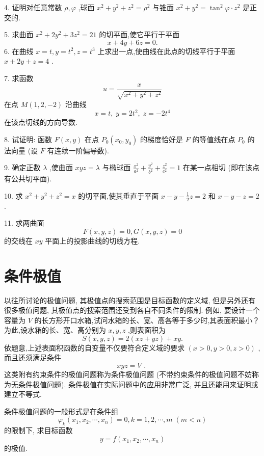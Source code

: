 4. 证明对任意常数 \(\rho ,\varphi\) ,球面 \({x}^{2} + {y}^{2} + {z}^{2} = {\rho }^{2}\) 与锥面 \({x}^{2} + {y}^{2} = {\tan }^{2}\varphi  \cdot  {z}^{2}\) 是正交的.

5. 求曲面 \({x}^{2} + 2{y}^{2} + 3{z}^{2} = {21}\) 的切平面,使它平行于平面
\[
x + {4y} + {6z} = 0.
\]
6. 在曲线 \(x = t,y = {t}^{2},z = {t}^{3}\) 上求出一点,使曲线在此点的切线平行于平面 \(x + {2y} + z = 4\) .

7. 求函数
\[
u = \frac{x}{\sqrt{{x}^{2} + {y}^{2} + {z}^{2}}}
\]
在点 \(M\left( {1,2, - 2}\right)\) 沿曲线
\[
x = t,\;y = 2{t}^{2},\;z =  - 2{t}^{4}
\]
在该点切线的方向导数.

8. 试证明: 函数 \(F\left( {x,y}\right)\) 在点 \({P}_{0}\left( {{x}_{0},{y}_{0}}\right)\) 的梯度恰好是 \(F\) 的等值线在点 \({P}_{0}\) 的法向量 (设 \(F\) 有连续一阶偏导数).

9. 确定正数 \(\lambda\) ,使曲面 \({xyz} = \lambda\) 与椭球面 \(\frac{{x}^{2}}{{a}^{2}} + \frac{{y}^{2}}{{b}^{2}} + \frac{{z}^{2}}{{c}^{2}} = 1\) 在某一点相切 (即在该点有公共切平面).

10. 求 \({x}^{2} + {y}^{2} + {z}^{2} = x\) 的切平面,使其垂直于平面 \(x - y - \frac{1}{2}z = 2\) 和 \(x - y - z = 2\) .

11. 求两曲面
\[
F\left( {x,y,z}\right)  = 0,G\left( {x,y,z}\right)  = 0
\]
的交线在 \({xy}\) 平面上的投影曲线的切线方程.

\section{条件极值}

以往所讨论的极值问题, 其极值点的搜索范围是目标函数的定义域, 但是另外还有很多极值问题, 其极值点的搜索范围还受到各自不同条件的限制. 例如, 要设计一个容量为 \(V\) 的长方形开口水箱,试问水箱的长、宽、高各等于多少时,其表面积最小？为此,设水箱的长、宽、高分别为 \(x,y,z\) ,则表面积为
\[
S\left( {x,y,z}\right)  = 2\left( {{xz} + {yz}}\right)  + {xy}.
\]
依题意,上述表面积函数的自变量不仅要符合定义域的要求 \(\left( {x > 0,y > 0,z > 0}\right)\) ,而且还须满足条件
\[
{xyz} = V\text{ . } \tag{1}
\]
这类附有约束条件的极值问题称为条件极值问题 (不带约束条件的极值问题不妨称为无条件极值问题). 条件极值在实际问题中的应用非常广泛, 并且还能用来证明或建立不等式.

条件极值问题的一般形式是在条件组
\[
{\varphi }_{k}\left( {{x}_{1},{x}_{2},\cdots ,{x}_{n}}\right)  = 0,k = 1,2,\cdots ,m\;\left( {m < n}\right)  \tag{2}
\]
的限制下, 求目标函数
\[
y = f\left( {{x}_{1},{x}_{2},\cdots ,{x}_{n}}\right)  \tag{3}
\]
的极值.

